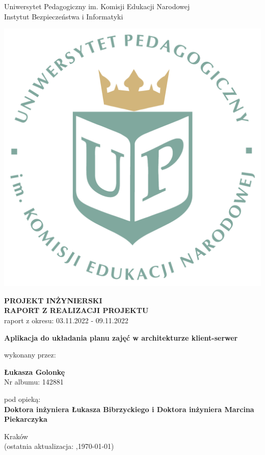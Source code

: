 \documentclass[12pt,a4paper,oneside]{article}
\theoremstyle{definition}
\numberwithin{equation}{section}
\begin{document}

\thispagestyle{empty}
\begin{titlepage}
\begin{center}\Large
Uniwersytet Pedagogiczny im. Komisji Edukacji Narodowej \\
\large
Instytut Bezpieczeństwa i Informatyki\\
\vskip 10pt
\end{center}
\begin{center}
\centering \includegraphics[width=0.4\columnwidth]{../resources/images/logoUP_pl.pdf}
\end{center}

\begin{center}
 {\bf \fontsize{14pt}{14pt}\selectfont PROJEKT INŻYNIERSKI \\ RAPORT Z REALIZACJI PROJEKTU\\
 }
 {\fontsize{12pt}{12pt} raport z okresu: 03.11.2022 - 09.11.2022}
\end{center}
\vskip 5pt
\begin{center}
 {\bf \fontsize{22pt}{22pt}\selectfont Aplikacja do układania planu zajęć w architekturze klient-serwer}
\end{center}

\begin{center}
 {\fontsize{12pt}{12pt}\selectfont wykonany przez: }
\end{center}
\begin{center}
 {\bf\fontsize{16pt}{16pt}\selectfont Łukasza Golonkę}\\
 {\fontsize{12pt}{12pt}\selectfont Nr albumu: 142881 \\}
\end{center}
\begin{center}
 {\fontsize{12pt}{12pt}\selectfont pod opieką:}\\
 {\bf\fontsize{12pt}{12pt}\selectfont Doktora inżyniera Łukasza Bibrzyckiego i Doktora inżyniera Marcina Piekarczyka}
\end{center}

\vspace*{\fill}
\begin{center}
\large
Kraków \the\year\\
(ostatnia aktualizacja: \DTMcurrenttime,\;\today)
\end{center}
\end{titlepage}
\setcounter{page}{0} 
\newpage\null\thispagestyle{empty}
\end{document}
